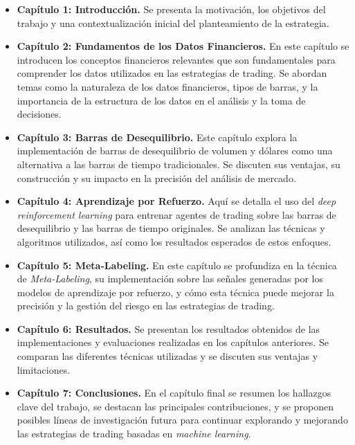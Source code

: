 \documentclass[a4paper,12pt, twoside]{report}
\begin{document}
\begin{itemize}
    \item \textbf{Capítulo 1: Introducción.} Se presenta la motivación, los objetivos del trabajo y una contextualización inicial del planteamiento de la estrategia.

    \item \textbf{Capítulo 2: Fundamentos de los Datos Financieros.} En este capítulo se introducen los conceptos financieros relevantes que son fundamentales para comprender los datos utilizados en las estrategias de trading. Se abordan temas como la naturaleza de los datos financieros, tipos de barras, y la importancia de la estructura de los datos en el análisis y la toma de decisiones.

    \item \textbf{Capítulo 3: Barras de Desequilibrio.} Este capítulo explora la implementación de barras de desequilibrio de volumen y dólares como una alternativa a las barras de tiempo tradicionales. Se discuten sus ventajas, su construcción y su impacto en la precisión del análisis de mercado.

    \item \textbf{Capítulo 4: Aprendizaje por Refuerzo.} Aquí se detalla el uso del \textit{deep reinforcement learning} para entrenar agentes de trading sobre las barras de desequilibrio y las barras de tiempo originales. Se analizan las técnicas y algoritmos utilizados, así como los resultados esperados de estos enfoques.

    \item \textbf{Capítulo 5: Meta-Labeling.} En este capítulo se profundiza en la técnica de \textit{Meta-Labeling}, su implementación sobre las señales generadas por los modelos de aprendizaje por refuerzo, y cómo esta técnica puede mejorar la precisión y la gestión del riesgo en las estrategias de trading.

    \item \textbf{Capítulo 6: Resultados.} Se presentan los resultados obtenidos de las implementaciones y evaluaciones realizadas en los capítulos anteriores. Se comparan las diferentes técnicas utilizadas y se discuten sus ventajas y limitaciones.

    \item \textbf{Capítulo 7: Conclusiones.} En el capítulo final se resumen los hallazgos clave del trabajo, se destacan las principales contribuciones, y se proponen posibles líneas de investigación futura para continuar explorando y mejorando las estrategias de trading basadas en \textit{machine learning}.
\end{itemize}
\end{document}
